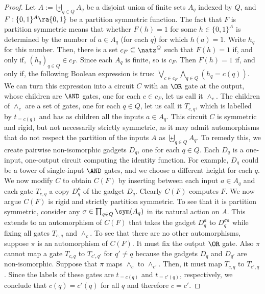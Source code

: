 \documentclass[11pt]{article}
\begin{document}
\begin{proof}
  Let $A := \biguplus_{q \in Q}A_q$ be a disjoint union of finite sets $A_q$
  indexed by $Q$, and $F : \{0, 1\}^A \ra \{0, 1\}$ be a partition symmetric
  function. The fact that $F$ is partition symmetric means that whether $F(h) =
  1$ for some $h \in \{0,1\}^A$ is determined by the number of $a \in A_q$ (for
  each $q$) for which $h(a) = 1$. Write $h_q$ for this number. Then, there is a
  set $c_F \subseteq \natz^Q$ such that $F(h) = 1$ if, and only if, $(h_q)_{q\in
    Q} \in c_F$. Since each $A_q$ is finite, so is $c_F$. Then $F(h) = 1$ if,
  and only if, the following Boolean expression is true: $\bigvee_{c \in
    c_F}\bigwedge_{q\in Q} (h_q = c(q)).$ We can turn this expression into a
  circuit $C$ with an $\OR$ gate at the output, whose children are $\AND$ gates,
  one for each $c \in c_F$, let us call it $\land_c$. The children of $\land_c$
  are a set of gates, one for each $q \in Q$, let us call it $T_{c,q}$, which is
  labelled by $t_{=c(q)}$ and has as children all the inputs $a \in A_q$.
  This circuit $C$ is symmetric and rigid, but not necessarily strictly
  symmetric, as it may admit automorphisms that do not respect the partition of
  the inputs $A$ as $\biguplus_{q \in Q}A_q$. To remedy this, we create pairwise
  non-isomorphic gadgets $D_q$, one for each $q \in Q$. Each $D_q$ is a
  one-input, one-output circuit computing the identity function. For example,
  $D_q$ could be a tower of single-input $\AND$ gates, and we choose a different
  height for each $q$. We now modify $C$ to obtain $C(F)$ by inserting between
  each input $a \in A_q$ and each gate $T_{c,q}$ a copy $D^a_q$ of the gadget
  $D_q$.
  Clearly $C(F)$ computes $F$. We now argue $C(F)$ is rigid and strictly partition
  symmetric. To see that it is partition symmetric, consider any $\sigma \in \prod_{q \in
    Q}\sym(A_q)$ in its natural action on $A$. This extends to an automorphism
  of $C(F)$ that takes the gadget $D^a_q$ to $D^{\sigma a}_q$ while fixing all
  gates $T_{c,q}$ and $\land_c$. To see that there are no other automorphisms,
  suppose $\pi$ is an automorphism of $C(F)$. It must fix the output $\OR$ gate.
  Also $\pi$ cannot map a gate $T_{c,q}$ to $T_{c',q'}$ for $q'\neq q$ because
  the gadgets $D_q$ and $D_{q'}$ are non-isomorphic. Suppose that $\pi$ maps
  $\land_c$ to $\land_{c'}$. Then, it must map $T_{c,q}$ to $T_{c',q}$. Since
  the labels of these gates are $t_{=c(q)}$ and $t_{=c'(q)}$, %
respectively, we
  conclude that $c(q) = c'(q)$ for all $q$ and therefore $c=c'$.
\end{proof}
\end{document}
